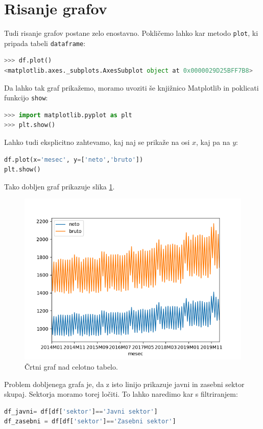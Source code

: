 \section{Risanje grafov}
Tudi risanje grafov postane zelo enostavno. Pokličemo lahko kar metodo \texttt{plot}, ki pripada tabeli \texttt{dataframe}:
\begin{lstlisting}[language=python]
>>> df.plot()
<matplotlib.axes._subplots.AxesSubplot object at 0x0000029D25BFF7B8>
\end{lstlisting}
Da lahko tak graf prikažemo, moramo uvoziti še knjižnico Matplotlib in poklicati funkcijo \texttt{show}:
\begin{lstlisting}[language=python]
>>> import matplotlib.pyplot as plt
>>> plt.show()
\end{lstlisting}
Lahko tudi eksplicitno zahtevamo, kaj naj se prikaže na osi $x$, kaj pa na $y$:
\begin{lstlisting}[language=python]
df.plot(x='mesec', y=['neto','bruto'])
plt.show()
\end{lstlisting}
Tako dobljen graf prikazuje slika \ref{img:plt_pandas1}.
\begin{figure}
    \includegraphics[width=\linewidth]{img/plt_pandas1.png}
    \caption{Črtni graf nad celotno tabelo.}
    \label{img:plt_pandas1}
\end{figure}
Problem dobljenega grafa je, da z isto linijo prikazuje javni in zasebni sektor skupaj. Sektorja moramo torej ločiti. To lahko naredimo kar s filtriranjem:
\begin{lstlisting}[language=python]
df_javni= df[df['sektor']=='Javni sektor'] 
df_zasebni = df[df['sektor']=='Zasebni sektor']
\end{lstlisting}
